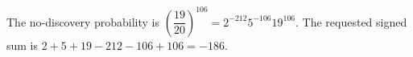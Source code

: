 The no-discovery probability is $\left(\dfrac{19}{20}\right)^{106}=\boxed{2^{-212}5^{-106}19^{106}}$. The requested signed sum is $2+5+19-212-106+106=\boxed{-186}$.
